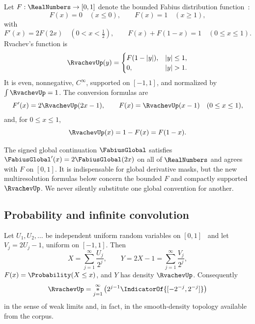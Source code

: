 \documentclass[11pt]{article}
\theoremstyle{definition}
\theoremstyle{remark}
\begin{document}
Let $F:\RealNumbers\to[0,1]$ denote the bounded Fabius distribution function~\cite{p8:fabius1966,p8:arias1982,p8:arias2018}:
\begin{equation}
 F(x)=0\quad(x\le0),\qquad
 F(x)=1\quad(x\ge1),                                      \label{p8:eq:F-boundary}
\end{equation}
with
\begin{equation}
 F'(x)=2F(2x)\quad(0<x<\tfrac12),
 \qquad F(x)+F(1-x)=1\quad(0\le x\le1).                  \label{p8:eq:F-basic}
\end{equation}
Rvachev's function is~\cite{p8:rvachev1971}
\begin{equation}
 \RvachevUp(y)=
 \begin{cases}
   F(1-|y|),& |y|\le1,\\
   0,& |y|>1.
 \end{cases}                                             \label{p8:eq:up-definition}
\end{equation}
It is even, nonnegative, $C^\infty$, supported on $[-1,1]$, and normalized by
$\int\RvachevUp=1$.  The conversion formulas are
\begin{equation}
 F'(x)=2\RvachevUp(2x-1),\qquad
 F(x)=\RvachevUp(x-1)\quad(0\le x\le1),                         \label{p8:eq:F-up-conversion}
\end{equation}
and, for $0\le x\le1$,
\begin{equation}
 \RvachevUp(x)=1-F(x)=F(1-x).                                   \label{p8:eq:up-survival}
\end{equation}

The signed global continuation $\FabiusGlobal$ satisfies
$\FabiusGlobal'(x)=2\FabiusGlobal(2x)$ on all of $\RealNumbers$ and agrees with $F$ on
$[0,1]$.  It is indispensable for global derivative masks, but the new
multiresolution formulas below concern the bounded $F$ and compactly supported
$\RvachevUp$.  We never silently substitute one global convention for another.

\subsection{Probability and infinite convolution}

\baseline Let $U_1,U_2,\ldots$ be independent uniform random variables on
$[0,1]$~\cite{p8:jessen1935} and let $V_j=2U_j-1$, uniform on $[-1,1]$.  Then
\begin{equation}
 X=\sum_{j=1}^\infty\frac{U_j}{2^j},
 \qquad
 Y=2X-1=\sum_{j=1}^\infty\frac{V_j}{2^j},                \label{p8:eq:random-series}
\end{equation}
$F(x)=\Probability(X\le x)$, and $Y$ has density $\RvachevUp$.  Consequently
\begin{equation}
 \RvachevUp=\mathop{\ast}_{j=1}^{\infty}
 \left(2^{j-1}\IndicatorOf{[-2^{-j},2^{-j}]}
 \right)              \label{p8:eq:infinite-convolution}
\end{equation}
in the sense of weak limits and, in fact, in the smooth-density topology
available from the corpus.
\end{document}
